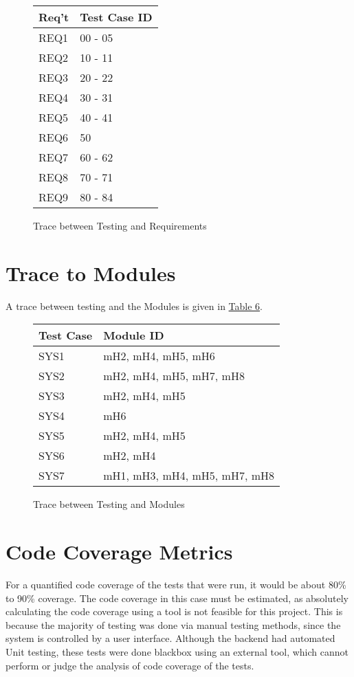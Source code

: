 \documentclass[12pt, titlepage]{article}
\begin{document}
\begin{figure}[h]
\centering
\caption{Trace between Testing and Requirements}
\begin{tabular}{| p{4cm} | p{4cm} |}
\hline
\textbf{Req't} & \textbf{Test Case ID}\\
\hline
REQ1 & 00 - 05\\ \hline
REQ2 & 10 - 11\\ \hline
REQ3 & 20 - 22\\ \hline
REQ4 & 30 - 31\\ \hline
REQ5 & 40 - 41\\ \hline
REQ6 & 50 \\ \hline
REQ7 & 60 - 62\\ \hline
REQ8 & 70 - 71\\ \hline
REQ9 & 80 - 84\\ \hline
\end{tabular}
\label{fig:table5}
\end{figure}

\section{Trace to Modules}
A trace between testing and the Modules is given in \hyperref[fig:table6]{Table 6}.

\begin{figure}[h]
\centering
\caption{Trace between Testing and Modules}
\begin{tabular}{| p{3cm} | p{7cm} |}
\hline
\textbf{Test Case} & \textbf{Module ID}\\
\hline
SYS1 & mH2, mH4, mH5, mH6\\ \hline
SYS2 & mH2, mH4, mH5, mH7, mH8\\ \hline
SYS3 & mH2, mH4, mH5\\ \hline
SYS4 & mH6\\ \hline
SYS5 & mH2, mH4, mH5\\ \hline
SYS6 & mH2, mH4\\ \hline
SYS7 & mH1, mH3, mH4, mH5, mH7, mH8\\ \hline
\end{tabular}
\label{fig:table6}
\end{figure}

\section{Code Coverage Metrics}
For a quantified code coverage of the tests that were run, it would be about 80\% to 90\% coverage. The code coverage in this case must be estimated, as absolutely calculating the code coverage using a tool is not feasible for this project. This is because the majority of testing was done via manual testing methods, since the system is controlled by a user interface. Although the backend had automated Unit testing, these tests were done blackbox using an external tool, which cannot perform or judge the analysis of code coverage of the tests.




\end{document}
